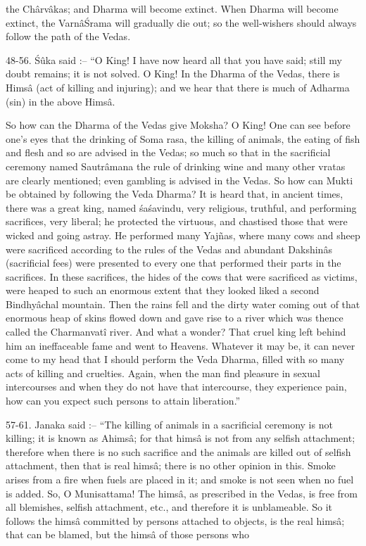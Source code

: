the Ch\^arv\^akas; and Dharma will become extinct. When Dharma will become extinct, the Varn\^a\'Srama will gradually die out; so the well-wishers should always follow the path of the Vedas.

48-56. \'S\^uka said :-- ``O King! I have now heard all that you have said; still my doubt remains; it is not solved. O King! In the Dharma of the Vedas, there is Hims\^a (act of killing and injuring); and we hear that there is much of Adharma (sin) in the above Hims\^a.

So how can the Dharma of the Vedas give Moksha? O King! One can see before one's eyes that the drinking of Soma rasa, the killing of animals, the eating of fish and flesh and so are advised in the Vedas; so much so that in the sacrificial ceremony named Sautr\^amana the rule of drinking wine and many other vratas are clearly mentioned; even gambling is advised in the Vedas. So how can Mukti be obtained by following the Veda Dharma? It is heard that, in ancient times, there was a great king, named \'sa\'savindu, very religious, truthful, and performing sacrifices, very liberal; he protected the virtuous, and chastised those that were wicked and going astray. He performed many Yajñas, where many cows and sheep were sacrificed according to the rules of the Vedas and abundant Dakshin\^as (sacrificial fees) were presented to every one that performed their parts in the sacrifices. In these sacrifices, the hides of the cows that were sacrificed as victims, were heaped to such an enormous extent that they looked liked a second Bindhy\^achal mountain. Then the rains fell and the dirty water coming out of that enormous heap of skins flowed down and gave rise to a river which was thence called the Charmanvat\^i river. And what a wonder? That cruel king left behind him an ineffaceable fame and went to Heavens. Whatever it may be, it can never come to my head that I should perform the Veda Dharma, filled with so many acts of killing and cruelties. Again, when the man find pleasure in sexual intercourses and when they do not have that intercourse, they experience pain, how can you expect such persons to attain liberation.''

57-61. Janaka said :-- ``The killing of animals in a sacrificial ceremony is not killing; it is known as Ahims\^a; for that hims\^a is not from any selfish attachment; therefore when there is no such sacrifice and the animals are killed out of selfish attachment, then that is real hims\^a; there is no other opinion in this. Smoke arises from a fire when fuels are placed in it; and smoke is not seen when no fuel is added. So, O Munisattama! The hims\^a, as prescribed in the Vedas, is free from all blemishes, selfish attachment, etc., and therefore it is unblameable. So it follows the hims\^a committed by persons attached to objects, is the real hims\^a; that can be blamed, but the hims\^a of those persons who

